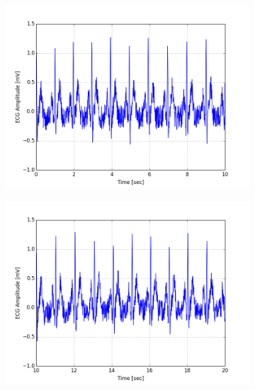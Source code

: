 \documentclass[paper=a4, fontsize=11pt]{scrartcl}
\numberwithin{equation}{section}		%
\numberwithin{figure}{section}			%
\numberwithin{table}{section}		    %
\begin{document}
\begin{appendices}
\begin{figure}[H]
	\centering
	\begin{subfigure}[b]{0.3\textwidth}
		\includegraphics[width=\textwidth]{sim/ecg_1}
	\end{subfigure}
	\begin{subfigure}[b]{0.3\textwidth}
		\includegraphics[width=\textwidth]{sim/ecg_2}
	\end{subfigure}
	\begin{subfigure}[b]{0.3\textwidth}

\end{subfigure}
\end{figure}
\end{appendices}
\end{document}
